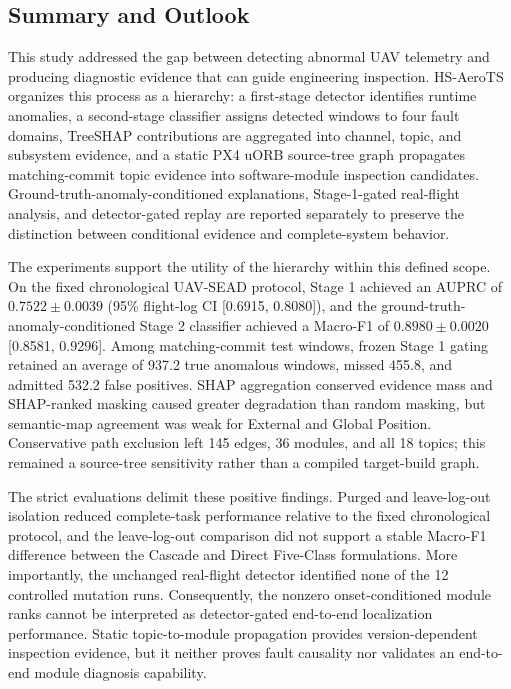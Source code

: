 \subsection{Summary and Outlook}

This study addressed the gap between detecting abnormal UAV telemetry and producing diagnostic evidence that can guide engineering inspection. HS-AeroTS organizes this process as a hierarchy: a first-stage detector identifies runtime anomalies, a second-stage classifier assigns detected windows to four fault domains, TreeSHAP contributions are aggregated into channel, topic, and subsystem evidence, and a static PX4 uORB source-tree graph propagates matching-commit topic evidence into software-module inspection candidates. Ground-truth-anomaly-conditioned explanations, Stage-1-gated real-flight analysis, and detector-gated replay are reported separately to preserve the distinction between conditional evidence and complete-system behavior.

The experiments support the utility of the hierarchy within this defined scope. On the fixed chronological UAV-SEAD protocol, Stage 1 achieved an AUPRC of $0.7522 \pm 0.0039$ (95\% flight-log CI [0.6915, 0.8080]), and the ground-truth-anomaly-conditioned Stage 2 classifier achieved a Macro-F1 of $0.8980 \pm 0.0020$ [0.8581, 0.9296]. Among matching-commit test windows, frozen Stage 1 gating retained an average of 937.2 true anomalous windows, missed 455.8, and admitted 532.2 false positives. SHAP aggregation conserved evidence mass and SHAP-ranked masking caused greater degradation than random masking, but semantic-map agreement was weak for External and Global Position. Conservative path exclusion left 145 edges, 36 modules, and all 18 topics; this remained a source-tree sensitivity rather than a compiled target-build graph.

The strict evaluations delimit these positive findings. Purged and leave-log-out isolation reduced complete-task performance relative to the fixed chronological protocol, and the leave-log-out comparison did not support a stable Macro-F1 difference between the Cascade and Direct Five-Class formulations. More importantly, the unchanged real-flight detector identified none of the 12 controlled mutation runs. Consequently, the nonzero onset-conditioned module ranks cannot be interpreted as detector-gated end-to-end localization performance. Static topic-to-module propagation provides version-dependent inspection evidence, but it neither proves fault causality nor validates an end-to-end module diagnosis capability.


